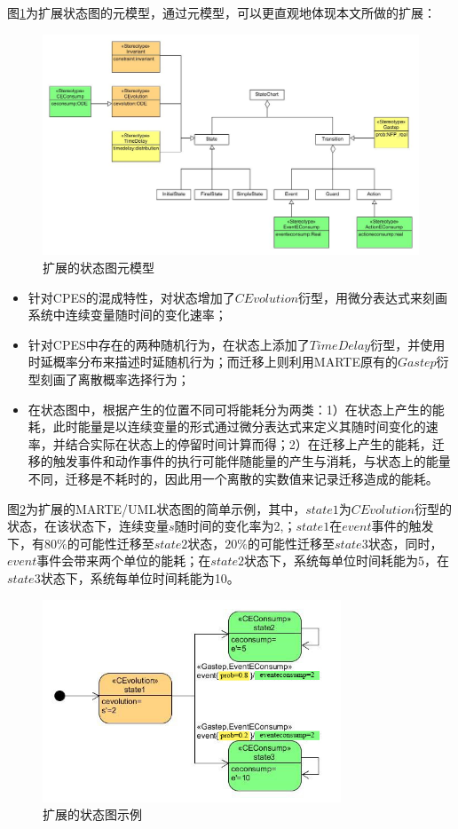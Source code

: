 	图\ref{metamodel-SC}为扩展状态图的元模型，通过元模型，可以更直观地体现本文所做的扩展：
	\begin{figure}[!t]
	\centering
	\includegraphics[width=6in]{metamodel-SC.jpg}
	\caption{扩展的状态图元模型}
	\label{metamodel-SC}
	\end{figure}	
	
	\begin{itemize}
	\item 针对CPES的混成特性，对状态增加了$CEvolution$衍型，用微分表达式来刻画系统中连续变量随时间的变化速率；
	\item 针对CPES中存在的两种随机行为，在状态上添加了$TimeDelay$衍型，并使用时延概率分布来描述时延随机行为；而迁移上则利用MARTE原有的$Gastep$衍型刻画了离散概率选择行为；
	\item 在状态图中，根据产生的位置不同可将能耗分为两类：1）在状态上产生的能耗，此时能量是以连续变量的形式通过微分表达式来定义其随时间变化的速率，并结合实际在状态上的停留时间计算而得；2）在迁移上产生的能耗，迁移的触发事件和动作事件的执行可能伴随能量的产生与消耗，与状态上的能量不同，迁移是不耗时的，因此用一个离散的实数值来记录迁移造成的能耗。
	\end{itemize}
	
	图\ref{example-SC}为扩展的MARTE/UML状态图的简单示例，其中，$state1$为$CEvolution$衍型的状态，在该状态下，连续变量$s$随时间的变化率为2,；$state1$在$event$事件的触发下，有$80\%$的可能性迁移至$state2$状态，$20\%$的可能性迁移至$state3$状态，同时，$event$事件会带来两个单位的能耗；在$state2$状态下，系统每单位时间耗能为5，在$state3$状态下，系统每单位时间耗能为10。
	
	\begin{figure}[!t]
	\centering
	\includegraphics[width=3.5in]{example-SC.jpg}
	\caption{扩展的状态图示例}
	\label{example-SC}
	\end{figure}
	
